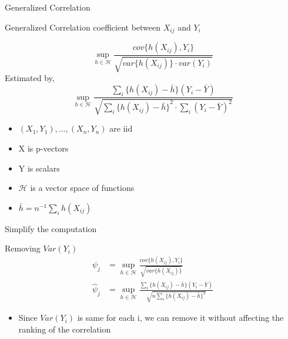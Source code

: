 \documentclass[ignorenonframetext,]{beamer}
\providecommand{\tightlist}{%
  \setlength{\itemsep}{0pt}\setlength{\parskip}{0pt}}
\begin{document}
\begin{frame}{Generalized Correlation}

\begin{block}{Generalized Correlation coefficient between $X_{ij}$ and $Y_i$}

\[
  \sup\limits_{h \in \mathcal{H}} \frac{cov\{h(X_{ij}), Y_i\}}{\sqrt{var\{h(X_{ij})\} \cdot var(Y_i)}}
\]
Estimated by,
\[
\sup\limits_{h \in \mathcal{H}} \frac{\sum_i\{h(X_{ij}) - \bar{h}\}(Y_i - \bar{Y})}{\sqrt{\sum_i {\{h(X_{ij})-\bar{h}\}}^2 \cdot \sum_i {(Y_i - \bar{Y})}^2}}
\]
\end{block}

\begin{itemize}
\tightlist
\item
  \((X_1, Y_1), \dots, (X_n, Y_n)\) are iid
\item
  X is p-vectors
\item
  Y is scalars
\item
  \(\mathcal{H}\) is a vector space of functions
\item
  \(\bar{h} = n^{-1}\sum_ih(X_{ij})\)
\end{itemize}

\end{frame}

\begin{frame}{Simplify the computation}

\begin{block}{Removing $Var(Y_i)$}
    \begin{align*} 
      \psi_j &= \sup\limits_{h \in \mathcal{H}} \frac{cov\{h(X_{ij}), Y_i\}}{\sqrt{var\{h(X_{ij})\}}} \\   
      \hat{\psi}_j &= \sup\limits_{h \in \mathcal{H}} \frac{\sum_i\{h(X_{ij}) - \bar{h}\}(Y_i - \bar{Y})}{\sqrt{n\sum_i \{h(X_{ij})-\bar{h}\}^2}}
    \end{align*} 
\end{block}

\begin{itemize}
\tightlist
\item
  Since \(Var(Y_i)\) is same for each i, we can remove it without
  affecting the ranking of the correlation
\end{itemize}

\end{frame}
\end{document}
